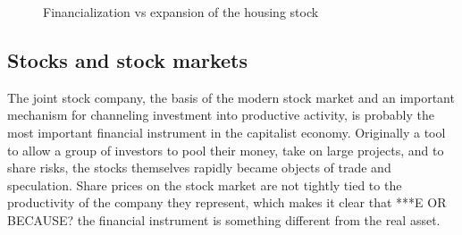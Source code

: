  \begin{figure}
\begin{center}
\end{center}
 \caption{Financialization vs expansion of the housing stock }
      \label{fig:Financialization-expansion}
  \end{figure}


\subsection{Stocks and stock markets}
The \gls{joint stock company}, the basis of the modern stock market and an important mechanism for channeling investment  into productive activity,  is probably the most important financial instrument in the capitalist economy. Originally a tool to allow a group of investors to pool their money, take on large projects, and to share risks, the stocks themselves rapidly became objects of trade and speculation. Share prices on the stock market are not tightly tied to the productivity of the company they represent, which makes it clear that ***E OR BECAUSE?   the financial instrument is something different from the real asset. 


